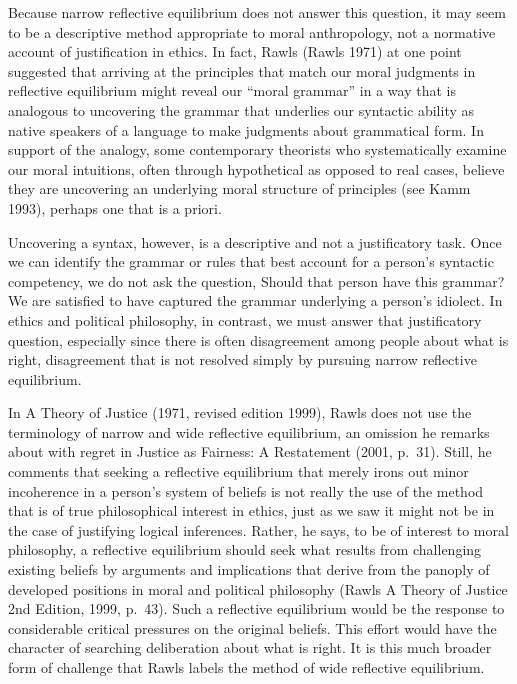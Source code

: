 \documentclass[]{article}
\begin{document}
Because narrow reflective equilibrium does not answer this question, it
may seem to be a descriptive method appropriate to moral anthropology,
not a normative account of justification in ethics. In fact, Rawls
(Rawls 1971) at one point suggested that arriving at the principles that
match our moral judgments in reflective equilibrium might reveal our
``moral grammar'' in a way that is analogous to uncovering the grammar
that underlies our syntactic ability as native speakers of a language to
make judgments about grammatical form. In support of the analogy, some
contemporary theorists who systematically examine our moral intuitions,
often through hypothetical as opposed to real cases, believe they are
uncovering an underlying moral structure of principles (see Kamm 1993),
perhaps one that is a priori.

Uncovering a syntax, however, is a descriptive and not a justificatory
task. Once we can identify the grammar or rules that best account for a
person's syntactic competency, we do not ask the question, Should that
person have this grammar? We are satisfied to have captured the grammar
underlying a person's idiolect. In ethics and political philosophy, in
contrast, we must answer that justificatory question, especially since
there is often disagreement among people about what is right,
disagreement that is not resolved simply by pursuing narrow reflective
equilibrium.

In A Theory of Justice (1971, revised edition 1999), Rawls does not use
the terminology of narrow and wide reflective equilibrium, an omission
he remarks about with regret in Justice as Fairness: A Restatement
(2001, p.~31). Still, he comments that seeking a reflective equilibrium
that merely irons out minor incoherence in a person's system of beliefs
is not really the use of the method that is of true philosophical
interest in ethics, just as we saw it might not be in the case of
justifying logical inferences. Rather, he says, to be of interest to
moral philosophy, a reflective equilibrium should seek what results from
challenging existing beliefs by arguments and implications that derive
from the panoply of developed positions in moral and political
philosophy (Rawls A Theory of Justice 2nd Edition, 1999, p.~43). Such a
reflective equilibrium would be the response to considerable critical
pressures on the original beliefs. This effort would have the character
of searching deliberation about what is right. It is this much broader
form of challenge that Rawls labels the method of wide reflective
equilibrium.
\end{document}
